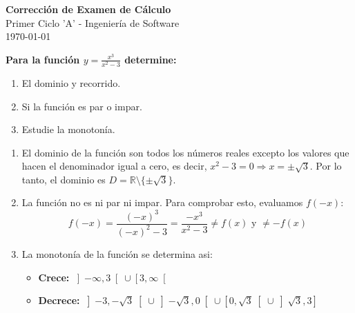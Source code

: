 \documentclass[answers]{exam}
\begin{document}
\begin{center}
	\Large\textbf{Corrección de Examen de Cálculo}\\[1em]
	\large Primer Ciclo 'A' - Ingeniería de Software\\[1em]
	\large \today
\end{center}

\vspace{0.5cm}

\begin{questions}

	\question \large\textbf{Para la función $\displaystyle y = \frac{x^3}{x^2 - 3} $ determine:}
	\begin{enumerate}[label=\alph*.]
		\item El dominio y recorrido.
		\item Si la función es par o impar.
		\item Estudie la monotonía.
	\end{enumerate}
	\begin{solution}
		\begin{enumerate}[label=\alph*.]
			\item El dominio de la función son todos los números reales excepto los valores que hacen el denominador igual a cero, es decir, $x^2 - 3 = 0 \Rightarrow x = \pm\sqrt{3}$. Por lo tanto, el dominio es $D = \mathbb{R} \setminus \{\pm\sqrt{3}\}$.

			\item La función no es ni par ni impar. Para comprobar esto, evaluamos $f(-x)$:
			      \[
				      f(-x) = \frac{(-x)^3}{(-x)^2 - 3} = \frac{-x^3}{x^2 - 3} \neq f(x) \text{ y } \neq -f(x)
			      \]

			\item La monotonía de la función se determina asi:
			      \begin{itemize}
				      \item \normalsize\textbf{Crece:} $\displaystyle
					            \left]-\infty, 3\right[\cup \left[3, \infty\right[
				            $
				      \item \normalsize\textbf{Decrece:} $\displaystyle
					            \left]-3, -\sqrt{3}\right[\cup \left]-\sqrt{3}, 0\right[\cup \left[0, \sqrt{3}\right[\cup \left]\sqrt{3}, 3\right]
				            $
			      \end{itemize}
		\end{enumerate}
		\vspace{0.5cm}



\end{solution}
\end{questions}
\end{document}
